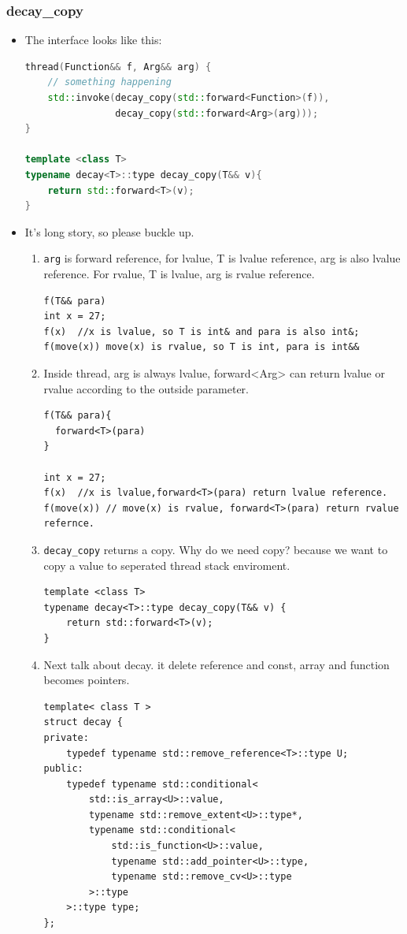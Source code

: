 \documentclass[a4paper,11pt,twoside]{book}
\begin{document}
\subsubsection{decay\_copy}
\begin{itemize}

    \item The interface looks like this:
\begin{lstlisting}[frame=single, language=c++]
thread(Function&& f, Arg&& arg) {
	// something happening
	std::invoke(decay_copy(std::forward<Function>(f)),
            	decay_copy(std::forward<Arg>(arg)));
}
	
template <class T> 
typename decay<T>::type decay_copy(T&& v){
	return std::forward<T>(v); 
}
\end{lstlisting}

		\item It's long story, so please buckle up.

		\begin{enumerate}
			\item \texttt{arg} is forward reference, for lvalue, T is lvalue reference, arg is also lvalue reference. For rvalue, T is lvalue, arg is rvalue reference. 
\begin{lstlisting}
f(T&& para)
int x = 27;
f(x)  //x is lvalue, so T is int& and para is also int&;
f(move(x)) move(x) is rvalue, so T is int, para is int&&
\end{lstlisting}

		\item Inside thread, arg is always lvalue, forward<Arg> can return lvalue or rvalue according to the outside parameter. 
\begin{lstlisting}
f(T&& para){
  forward<T>(para)
}

int x = 27;
f(x)  //x is lvalue,forward<T>(para) return lvalue reference. 
f(move(x)) // move(x) is rvalue, forward<T>(para) return rvalue refernce. 
\end{lstlisting}

		\item \texttt{decay\_copy} returns a copy. Why do we need copy? because we want to copy a value to seperated thread stack enviroment. 
\begin{lstlisting}
template <class T>
typename decay<T>::type decay_copy(T&& v) {
    return std::forward<T>(v);
}
\end{lstlisting}

		\item Next talk about decay. it delete reference and const, array and function becomes pointers.
\begin{lstlisting}
template< class T >
struct decay {
private:
    typedef typename std::remove_reference<T>::type U;
public:
    typedef typename std::conditional< 
        std::is_array<U>::value,
        typename std::remove_extent<U>::type*,
        typename std::conditional< 
            std::is_function<U>::value,
            typename std::add_pointer<U>::type,
            typename std::remove_cv<U>::type
        >::type
    >::type type;
};
\end{lstlisting}
	

\end{enumerate}
\end{itemize}
\end{document}
